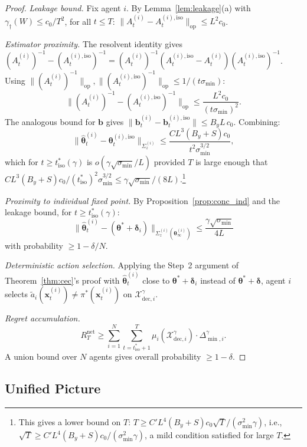 \documentclass[11pt]{article}
\begin{document}
\begin{proof}
\textit{Leakage bound.}
Fix agent $i$.  By Lemma~\ref{lem:leakage}(a) with
$\gamma_\dagger(W)\leq c_0/T^2$,
for all $t\leq T$:
$\|A_t^{(i)}-A_t^{(i),\mathrm{iso}}\|_{\mathrm{op}}\leq L^2 c_0$.

\textit{Estimator proximity.}
The resolvent identity gives
$(A_t^{(i)})^{-1}-(A_t^{(i),\mathrm{iso}})^{-1}
=(A_t^{(i)})^{-1}(A_t^{(i),\mathrm{iso}}-A_t^{(i)})(A_t^{(i),\mathrm{iso}})^{-1}$.
Using $\|(A_t^{(i)})^{-1}\|_{\mathrm{op}},\|(A_t^{(i),\mathrm{iso}})^{-1}\|_{\mathrm{op}}
\leq 1/(t\sigma_{\min})$:
\[
\|(A_t^{(i)})^{-1}-(A_t^{(i),\mathrm{iso}})^{-1}\|_{\mathrm{op}}
\leq\frac{L^2 c_0}{(t\sigma_{\min})^2}.
\]
The analogous bound for $\bm{b}$ gives
$\|\bm{b}_t^{(i)}-\bm{b}_t^{(i),\mathrm{iso}}\|\leq B_y L\,c_0$.
Combining:
\[
\|\widehat{\bm{\theta}}_t^{(i)}-\bm{\theta}_t^{(i),\mathrm{iso}}\|_{\Sigma_z^{(i)}}
\leq\frac{CL^3(B_y+S)c_0}{t^2\sigma_{\min}^{3/2}},
\]
which for $t\geq t_{\mathrm{iso}}^*(\gamma)$ is $o(\gamma\sqrt{\sigma_{\min}}/L)$
provided $T$ is large enough that
$CL^3(B_y+S)c_0/(t_{\mathrm{iso}}^*)^2\sigma_{\min}^{3/2}
\leq\gamma\sqrt{\sigma_{\min}}/(8L)$.\footnote{This gives a lower
bound on $T$: $T\geq C'L^4(B_y+S)c_0\sqrt{T}/(\sigma_{\min}^2\gamma)$,
i.e., $\sqrt{T}\geq C'L^4(B_y+S)c_0/(\sigma_{\min}^2\gamma)$,
a mild condition satisfied for large $T$.}

\textit{Proximity to individual fixed point.}
By Proposition~\ref{prop:conc_ind} and the leakage bound,
for $t\geq t_{\mathrm{iso}}^*(\gamma)$:
\[
\|\widehat{\bm{\theta}}_t^{(i)}-(\bm{\theta}^{\!*}+\bm{\delta}_i)\|_{\Sigma_z^{(i)}(\bm{\theta}_\infty^{(i)})}
\leq\frac{\gamma\sqrt{\sigma_{\min}}}{4L}
\]
with probability $\geq 1-\delta/N$.

\textit{Deterministic action selection.}
Applying the Step~2 argument of Theorem~\ref{thm:cec}'s proof
with $\widehat{\bm{\theta}}_t^{(i)}$ close to
$\bm{\theta}^{\!*}+\bm{\delta}_i$ instead of $\bm{\theta}^{\!*}+\bm{\delta}$,
agent $i$ selects $\tilde{a}_i(\bm{x}_t^{(i)})\neq\pi^{\!*}(\bm{x}_t^{(i)})$
on $\mathcal{X}_{\mathrm{dec},i}^\gamma$.

\textit{Regret accumulation.}
\[
R_T^{\mathrm{net}}
\geq\sum_{i=1}^N\sum_{t=t_{\mathrm{iso}}^*+1}^T
\mu_i(\mathcal{X}_{\mathrm{dec},i}^\gamma)\cdot\Delta_{\min,i}^\gamma.
\]
A union bound over $N$ agents gives overall probability $\geq 1-\delta$.
\end{proof}

\subsection{Unified Picture}
\end{document}

